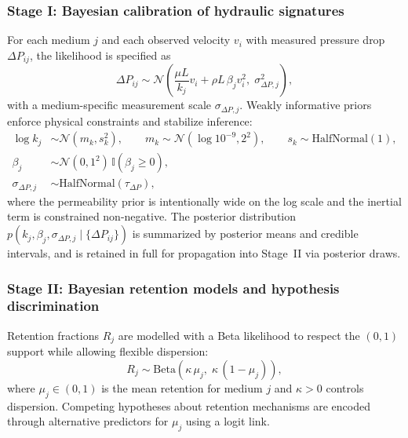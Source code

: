 \documentclass[12pt,a4paper]{article}
\begin{document}
\subsubsection{Stage I: Bayesian calibration of hydraulic signatures}
For each medium $j$ and each observed velocity $v_{i}$ with measured pressure drop $\Delta P_{ij}$, the likelihood is specified as
\begin{equation}
\Delta P_{ij} \sim \mathcal{N}\!\left(\frac{\mu L}{k_j}v_i + \rho L\,\beta_j v_i^2,\;\sigma_{\Delta P,j}^2\right),
\end{equation}
with a medium-specific measurement scale $\sigma_{\Delta P,j}$. Weakly informative priors enforce physical constraints and stabilize inference:
\begin{align}
\log k_j &\sim \mathcal{N}(m_k, s_k^2), \qquad m_k \sim \mathcal{N}(\log 10^{-9}, 2^2), \qquad s_k \sim \mathrm{HalfNormal}(1), \\
\beta_j &\sim \mathcal{N}(0, 1^2)\,\mathbb{I}(\beta_j\ge 0), \\
\sigma_{\Delta P,j} &\sim \mathrm{HalfNormal}(\tau_{\Delta P}),
\end{align}
where the permeability prior is intentionally wide on the log scale and the inertial term is constrained non-negative. The posterior distribution $p(k_j,\beta_j,\sigma_{\Delta P,j}\mid \{\Delta P_{ij}\})$ is summarized by posterior means and credible intervals, and is retained in full for propagation into Stage~II via posterior draws.

\subsubsection{Stage II: Bayesian retention models and hypothesis discrimination}
Retention fractions $R_j$ are modelled with a Beta likelihood to respect the $(0,1)$ support while allowing flexible dispersion:
\begin{equation}
R_j \sim \mathrm{Beta}\!\left(\kappa\,\mu_j,\; \kappa\,(1-\mu_j)\right),
\end{equation}
where $\mu_j\in(0,1)$ is the mean retention for medium $j$ and $\kappa>0$ controls dispersion. Competing hypotheses about retention mechanisms are encoded through alternative predictors for $\mu_j$ using a logit link.
\end{document}
